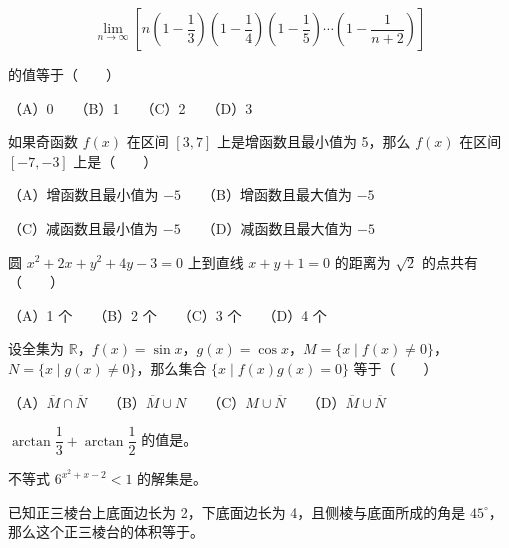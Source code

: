\begin{question}

\nopagebreak[4]
\[
\lim_{n\to\infty}\left[n\left(1-\frac13\right)\left(1-\frac14\right)\left(1-\frac15\right)\cdots\left(1-\frac1{n+2}\right)\right]
\]

的值等于\mbox{（　　）}

（A）0　　（B）1　　（C）2　　（D）3

\end{question}
\begin{question}

如果奇函数 $f(x)$ 在区间 $[3,7]$ 上是增函数且最小值为 5，那么 $f(x)$ 在区间 $[-7,-3]$ 上是\mbox{（　　）}

（A）增函数且最小值为 $-5$　　（B）增函数且最大值为 $-5$

（C）减函数且最小值为 $-5$　　（D）减函数且最大值为 $-5$

\end{question}
\begin{question}

圆 $x^2+2x+y^2+4y-3=0$ 上到直线 $x+y+1=0$ 的距离为 $\sqrt2$ 的点共有\mbox{（　　）}

（A）1 个　　（B）2 个　　（C）3 个　　（D）4 个

\end{question}
\begin{question}

设全集为 $\mathbb R$，$f(x)=\sin x$，$g(x)=\cos x$，$M=\{x\mid f(x)\ne0\}$，$N=\{x\mid g(x)\ne0\}$，那么集合 $\{x\mid f(x)g(x)=0\}$ 等于\mbox{（　　）}

（A）$\overline M\cap\overline N$　　（B）$\overline M\cup N$　　（C）$M\cup\overline N$　　（D）$\overline M\cup\overline N$

\end{question}
\begin{question}

$\arctan\dfrac13+\arctan\dfrac12$ 的值是\underline{\hspace{6em}}。

\end{question}
\begin{question}

不等式 $6^{x^2+x-2}<1$ 的解集是\underline{\hspace{8em}}。

\end{question}
\begin{question}

已知正三棱台上底面边长为 2，下底面边长为 4，且侧棱与底面所成的角是 $45^\circ$，那么这个正三棱台的体积等于\underline{\hspace{6em}}。

\end{question}
